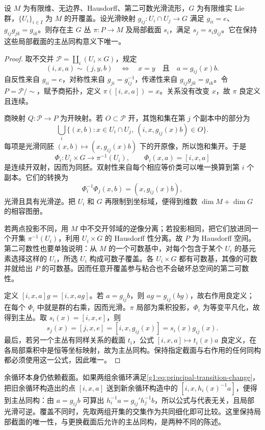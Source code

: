 \begin{theorem}\label{g1:thm:principal-cocycle-gluing}
	设 \(M\) 为有限维、无边界、Hausdorff、第二可数光滑流形，\(G\) 为有限维实 Lie 群，\(\{U_i\}_{i\in I}\) 为 \(M\) 的开覆盖。设光滑映射 \(g_{ij}:U_i\cap U_j\to G\) 满足 \(g_{ii}=e\)、\(g_{ij}g_{jk}=g_{ik}\)。则存在主 \(G\) 丛 \(\pi:P\to M\) 及局部截面 \(s_i\)，满足 \(s_j=s_i g_{ij}\)。它在保持这些局部截面的主丛同构意义下唯一。
\end{theorem}
\begin{proof}
	取不交并 \(\mathcal P=\coprod_i(U_i\times G)\)，规定
	\[
		(i,x,a)\sim(j,y,b)
		\quad\Longleftrightarrow\quad
		x=y\quad\text{且}\quad a=g_{ij}(x)b.
	\]
	自反性来自 \(g_{ii}=e\)，对称性来自 \(g_{ji}=g_{ij}^{-1}\)，传递性来自 \(g_{ij}g_{jk}=g_{ik}\)。令 \(P=\mathcal P/\!\sim\)，赋予商拓扑，定义 \(\pi([i,x,a])=x\)。关系没有改变 \(x\)，故 \(\pi\) 良定义且连续。

	商映射 \(Q:\mathcal P\to P\) 为开映射。若 \(O\subset\mathcal P\) 开，其饱和集在第 \(j\) 个副本中的部分为
	\[
		\bigcup_i\{(x,b):x\in U_i\cap U_j,\ (i,x,g_{ij}(x)b)\in O\}.
	\]
	每项是光滑同胚 \((x,b)\mapsto(x,g_{ij}(x)b)\) 下的开原像，所以饱和集开。于是
	\[
		\Phi_i:U_i\times G\longrightarrow\pi^{-1}(U_i),\qquad
		\Phi_i(x,a)=[i,x,a]
	\]
	是连续开双射，因而为同胚。双射性来自每个相应等价类可以唯一换算到第 \(i\) 个副本。它们的转换为
	\[
		\Phi_i^{-1}\Phi_j(x,b)=(x,g_{ij}(x)b),
	\]
	光滑且具有光滑逆。把 \(U_i\) 和 \(G\) 再限制到坐标域，便得到维数 \(\dim M+\dim G\) 的相容图册。

	若两点投影不同，用 \(M\) 中不交开邻域的逆像分离；若投影相同，把它们放进同一个开集 \(\pi^{-1}(U_i)\)，利用 \(U_i\times G\) 的 Hausdorff 性分离。故 \(P\) 为 Hausdorff 空间。第二可数性也要单独说明：从 \(M\) 的一个可数基中，对每个包含于某个 \(U_i\) 的基元素选择这样的 \(U_i\)，所选 \(U_i\) 构成可数子覆盖。各 \(U_i\times G\) 都有可数基，其像的可数并就给出 \(P\) 的可数基。因而任意开覆盖参与粘合也不会破坏总空间的第二可数性。

	定义 \([i,x,a]g=[i,x,ag]\)。若 \(a=g_{ij}b\)，则 \(ag=g_{ij}(bg)\)，故右作用良定义；在每个 \(\Phi_i\) 中就是群的右乘，因而光滑。\(\pi\) 局部为乘积投影，\(\Phi_i\) 为等变平凡化，故得到主丛。取 \(s_i(x)=[i,x,e]\)，则
	\[
		s_j(x)=[j,x,e]=[i,x,g_{ij}(x)]=s_i(x)g_{ij}(x).
	\]
	最后，若另一个主丛有同样关系的截面 \(t_i\)，公式 \([i,x,a]\mapsto t_i(x)a\) 良定义，在各局部乘积中是恒等坐标映射，故为主丛同构。保持指定截面与右作用的任何同构都必须使用这一公式，因此唯一。
\end{proof}

余循环本身仍依赖截面。如果两组余循环满足\eqref{g1:eq:principal-transition-change}，把旧余循环构造出的点 \([i,x,a]\) 送到新余循环构造中的 \([i,x,h_i(x)^{-1}a]\)，便得到主丛同构：由 \(a=g_{ij}b\) 可算出 \(h_i^{-1}a=g_{ij}'h_j^{-1}b\)，所以公式与代表无关，且局部光滑可逆。覆盖不同时，先取两组开集的交集作为共同细化即可比较。这里保持局部截面的唯一性，与更换截面后允许的主丛同构，是两种不同的陈述。

